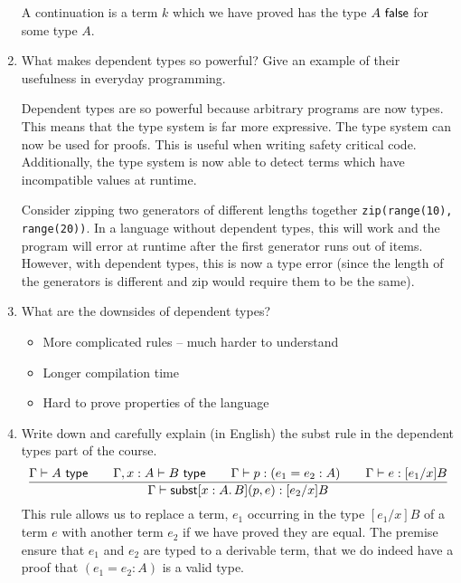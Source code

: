 \documentclass[10pt,\jkfside,a4paper]{article}
\newcommand{\subst}{\ensuremath{\mathsf{subst}}\xspace}
\begin{document}
\begin{enumerate}
\begin{definition}[Contradiction]
    \end{definition}

    \begin{definition}[Continuation]

        A continuation is a term $k$ which we have proved has the type $A\ \false$ for some type $A$.

    \end{definition}

    \item What makes dependent types so powerful? Give an example of their usefulness in everyday programming.

    Dependent types are so powerful because arbitrary programs are now types. This means that the type system is far more expressive. The type system can now be used for proofs. This is useful when writing safety critical code. Additionally, the type system is now able to detect terms which have incompatible values at runtime.

    Consider zipping two generators of different lengths together \ie \texttt{zip(range(10), range(20))}. In a language without dependent types, this will work and the program will error at runtime after the first generator runs out of items. However, with dependent types, this is now a type error (since the length of the generators is different and zip would require them to be the same).

    \item What are the downsides of dependent types?

    \begin{itemize}

        \item More complicated rules -- much harder to understand

        \item Longer compilation time

        \item Hard to prove properties of the language

    \end{itemize}

    \item Write down and carefully explain (in English) the subst rule in the dependent types part of the course.
    \[
        \dfrac{
            \Gamma \vdash A\ \type
            \qquad
            \Gamma, x: A \vdash B\ \type
            \qquad
            \Gamma \vdash p: (e_1 = e_2: A)
            \qquad
            \Gamma \vdash e: [e_1/x]B
        }{
            \Gamma \vdash \subst[x: A\ldotp B](p, e): [e_2/x]B
        }
    \]
    This rule allows us to replace a term, $e_1$ occurring in the type $[e_1/x]B$ of a term $e$ with another term $e_2$ if we have proved they are equal. The premise ensure that $e_1$ and $e_2$ are typed to a derivable term, that we do indeed have a proof that $(e_1 = e_2: A)$ is a valid type.

\end{enumerate}
\end{document}
